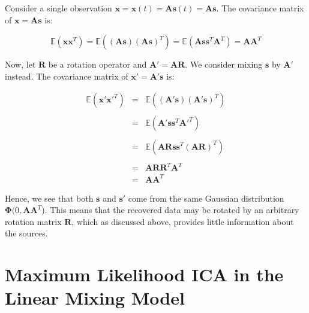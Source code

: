 \documentclass[11pt, oneside, a4paper]{report}
\begin{document}
Consider a single observation
$\boldsymbol{x} = \boldsymbol{x}(t) =\boldsymbol{A}\boldsymbol{s}(t) =
\boldsymbol{A}\boldsymbol{s}$. The covariance matrix of
$\boldsymbol{x} = \boldsymbol{A}\boldsymbol{s}$ is:


    \begin{equation}
      \mathbb{E}(\boldsymbol{x}\boldsymbol{x}^T) 
      = \mathbb{E}((\boldsymbol{A}\boldsymbol{s})(\boldsymbol{A}\boldsymbol{s})^T) = \mathbb{E}(\boldsymbol{A}\boldsymbol{s}\boldsymbol{s}^T\boldsymbol{A}^T)=\boldsymbol{A}\boldsymbol{A}^T      
    \end{equation}

Now, let $\boldsymbol{R}$ be a rotation operator and $\boldsymbol{A}'
= \boldsymbol{AR}$. We consider mixing $\boldsymbol{s}$ by
$\boldsymbol{A}'$ instead. The covariance matrix of  
$\boldsymbol{x}' = \boldsymbol{A}'\boldsymbol{s}$ is:


\begin{equation}
  \begin{array}{lcl}
    \mathbb{E}(\boldsymbol{x}'\boldsymbol{x}'^T) & = &
    \mathbb{E}((\boldsymbol{A}'\boldsymbol{s})(\boldsymbol{A}'\boldsymbol{s})^T) \\
    \\& = & \mathbb{E}(\boldsymbol{A}'\boldsymbol{s}\boldsymbol{s}^T\boldsymbol{A}'^T) \\
    \\& = & \mathbb{E}(\boldsymbol{A}\boldsymbol{R}\boldsymbol{s}\boldsymbol{s}^T(\boldsymbol{A}\boldsymbol{R})^T) \\
    \\& = & \boldsymbol{A}\boldsymbol{R}\boldsymbol{R}^T\boldsymbol{A}^T
    \\& = & \boldsymbol{A}\boldsymbol{A}^T
  \end{array}
\end{equation}

Hence, we see that both $\boldsymbol{s}$ and $\boldsymbol{s}'$ come
from the same Gaussian distribution $\boldsymbol{\Phi}(0,
\boldsymbol{A}\boldsymbol{A}^T$). This means that the recovered data
may be rotated by an arbitrary rotation matrix $\boldsymbol{R}$, which
as discussed above, provides little information about the sources. 


\section{Maximum Likelihood ICA in the Linear Mixing Model}\label{linear_model_ica}
\end{document}
